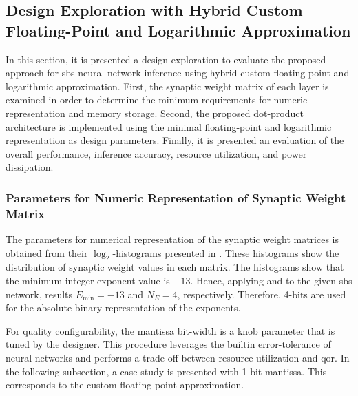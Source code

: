 \subsection{Design Exploration with Hybrid Custom Floating-Point and Logarithmic Approximation}

In this section, it is presented a design exploration to evaluate the proposed approach for \gls{sbs} neural network inference using hybrid custom floating-point and logarithmic approximation. First, the synaptic weight matrix of each layer is examined in order to determine the minimum requirements for numeric representation and memory storage. Second, the proposed dot-product architecture is implemented using the minimal floating-point and logarithmic representation as design parameters. Finally, it is presented an evaluation of the overall performance, inference accuracy, resource utilization, and power dissipation.

\subsubsection{Parameters for Numeric Representation of Synaptic Weight Matrix}
\label{sec:parameters}

	The parameters for numerical representation of the synaptic weight matrices is obtained from their $\log_2$-histograms presented in {}. These histograms show the distribution of synaptic weight values in each matrix. The histograms show that the minimum integer exponent value is $-13$. Hence, applying {} and {} to the given \gls{sbs} network, results $E_{\min}=-13$ and $N_E=4$, respectively. Therefore, 4-bits are used for the absolute binary representation of the exponents.


For quality configurability, the mantissa bit-width is a knob parameter that is tuned by the designer. This procedure leverages the builtin error-tolerance of neural networks and performs a trade-off between resource utilization and \gls{qor}. In the following subsection, a case study is presented with 1-bit mantissa. This corresponds to the custom floating-point approximation.

